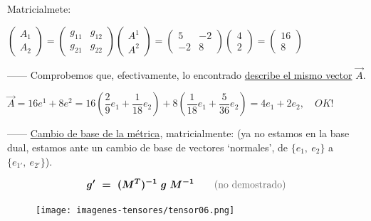 \textcolor{gris}{Matricialmete:}

\textcolor{gris}
{$
\left( \begin{matrix} A_1\\A_2 \end{matrix} \right)=
\left( \begin{matrix} g_{11} & g_{12} \\ g_{21} & g_{22} \end{matrix} \right)
\left( \begin{matrix} A^1 \\ A^2 \end{matrix} \right) =
\left( \begin{matrix} 5 & -2 \\ -2 & 8 \end{matrix} \right)
\left( \begin{matrix} 4 \\ 2 \end{matrix} \right) =
\left( \begin{matrix} 16 \\ 8 \end{matrix} \right) 
$}

------ Comprobemos que, efectivamente, lo encontrado \underline{describe el mismo vector} $\overrightarrow A$.

$\overrightarrow A=16e^1+8e^2=16 \left(\dfrac 2 9 e_1+\dfrac 1 {18} e_2 \right) + 8 \left( \dfrac 1 {18} e_1+\dfrac 5 {36} e_2 \right)=4e_1+2e_2,\quad OK!$

------ \underline{Cambio de base de la métrica}, matricialmente: (ya no estamos en la base dual, estamos ante un cambio de base de vectores `normales', de $\{e_1,\ e_2\}$ a $\{e_{1'},\ e_{2'}\}$).

\begin{multicols}{2}
$$\boldsymbol{ g'\ = \ (M^T)^{-1} \ g \ M^{-1} } \qquad \textcolor{gris}{\text{(no demostrado)}}$$

	\begin{figure}[H]
		\centering
		\texttt{[image: imagenes-tensores/tensor06.png]}
	\end{figure}
\end{multicols}



